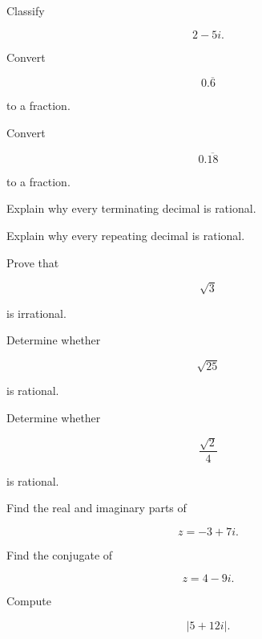 \begin{exercise}[2]
Classify

\[
2-5i.
\]
\end{exercise}

\begin{exercise}[2]
Convert

\[
0.\overline{6}
\]

to a fraction.
\end{exercise}

\begin{exercise}[2]
Convert

\[
0.\overline{18}
\]

to a fraction.
\end{exercise}

\begin{exercise}[2]
Explain why every terminating decimal is rational.
\end{exercise}

\begin{exercise}[2]
Explain why every repeating decimal is rational.
\end{exercise}

\begin{exercise}[3]
Prove that

\[
\sqrt3
\]

is irrational.
\end{exercise}

\begin{exercise}[2]
Determine whether

\[
\sqrt{25}
\]

is rational.
\end{exercise}

\begin{exercise}[2]
Determine whether

\[
\frac{\sqrt2}{4}
\]

is rational.
\end{exercise}

\begin{exercise}[2]
Find the real and imaginary parts of

\[
z=-3+7i.
\]
\end{exercise}

\begin{exercise}[2]
Find the conjugate of

\[
z=4-9i.
\]
\end{exercise}

\begin{exercise}[2]
Compute

\[
|5+12i|.
\]
\end{exercise}

